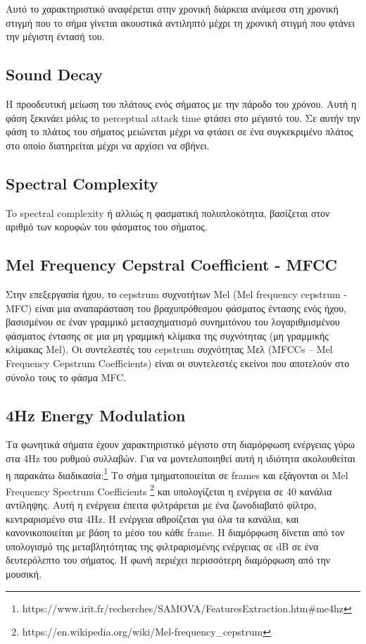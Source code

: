 Αυτό το χαρακτηριστικό αναφέρεται στην χρονική διάρκεια ανάμεσα στη χρονική στιγμή που το σήμα γίνεται ακουστικά αντιληπτό μέχρι τη χρονική στιγμή που φτάνει την μέγιστη έντασή του. 

\subsection{Sound Decay}

Η προοδευτική μείωση του πλάτους ενός σήματος με την πάροδο του χρόνου. Αυτή η φάση ξεκινάει μόλις το perceptual attack time φτάσει στο μέγιστό του. Σε αυτήν την φάση το πλάτος του σήματος μειώνεται μέχρι να φτάσει σε ένα συγκεκριμένο πλάτος στο οποίο διατηρείται μέχρι να αρχίσει να σβήνει.


\subsection{Spectral Complexity}
 
 To spectral complexity ή αλλιώς η φασματική πολυπλοκότητα, βασίζεται στον αριθμό των κορυφών του φάσματος του σήματος.

\subsection{Mel Frequency Cepstral Coefficient - MFCC }

Στην επεξεργασία ήχου, το cepstrum συχνοτήτων Mel (Μel frequency cepstrum - MFC)
είναι μια αναπαράσταση του βραχυπρόθεσμου φάσματος έντασης ενός ήχου, βασισμένου σε έναν γραμμικό μετασχηματισμό συνημιτόνου του λογαριθμισμένου φάσματος έντασης σε μια μη γραμμική κλίμακα της συχνότητας (μη γραμμικής κλίμακας Mel).  Οι συντελεστές του cepstrum συχνότητας Μελ (MFCCs – Mel Frequency Cepstrum Coefficients) είναι οι συντελεστές εκείνοι που αποτελούν στο σύνολο τους το φάσμα MFC.


\subsection{4Hz Energy Modulation}

Τα φωνητικά σήματα έχουν χαρακτηριστικό μέγιστο στη διαμόρφωση ενέργειας γύρω στα 4Hz του ρυθμού συλλαβών. Για να μοντελοποιηθεί αυτή η ιδιότητα ακολουθείται η παρακάτω διαδικασία:\footnote{https://www.irit.fr/recherches/SAMOVA/FeaturesExtraction.htm\#me4hz} Το σήμα τμηματοποιείται σε frames και εξάγονται οι Mel Frequency Spectrum Coefficients \footnote{https://en.wikipedia.org/wiki/Mel-frequency\_cepstrum} και υπολογίζεται η ενέργεια σε 40 κανάλια αντίληψης. Αυτή η ενέργεια έπειτα φιλτράρεται με ένα ζωνοδιαβατό φίλτρο, κεντραρισμένο στα 4Hz. Η ενέργεια αθροίζεται για όλα τα κανάλια, και κανονικοποιείται με βάση το μέσο του κάθε frame. Η διαμόρφωση δίνεται από τον υπολογισμό της μεταβλητότητας της φιλτραρισμένης ενέργειας σε dB σε ένα δευτερόλεπτο του σήματος. Η φωνή περιέχει περισσότερη διαμόρφωση από την μουσική.


